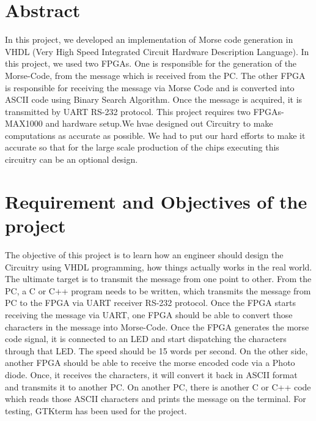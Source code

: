\documentclass[12pt,a4paper]{article}
\begin{document}
\newpage
\section*{Abstract}
In this project, we developed an implementation of Morse code generation in VHDL (Very High Speed Integrated Circuit Hardware Description Language). In this project, we used two FPGAs. One is responsible for the generation of the Morse-Code, from the message which is received from the PC. The other FPGA is responsible for receiving the message via Morse Code and is converted into ASCII code using Binary Search Algorithm. Once the message is acquired, it is transmitted by UART RS-232 protocol. This project requires two FPGAs- MAX1000 and hardware setup.We hvae designed out Circuitry to make computations as accurate as possible. We had to put our hard efforts to make it accurate so that for the large scale production of the chips executing this circuitry can be an optional design. \\


\newpage
\section*{Requirement and Objectives of the project}
The objective of this project is to learn how an engineer should design the Circuitry using VHDL programming, how things actually works in the real world. The ultimate target is to transmit the message from one point to other. From the PC, a C or C++ program needs to be written, which transmits the message from PC to the FPGA via UART receiver RS-232 protocol. Once the FPGA starts receiving the message via UART, one FPGA should be able to convert those characters in the message into Morse-Code. Once the FPGA generates the morse code signal, it is connected to an LED and start dispatching the characters through that LED. The speed should be 15 words per second. On the other side, another FPGA should be able to receive the morse encoded code via a Photo diode. Once, it receives the characters, it will convert it back in ASCII format and transmits it to another PC. On another PC, there is another C or C++ code which reads those ASCII characters and prints the message on the terminal. For testing, GTKterm has been used for the project.\\
\end{document}
